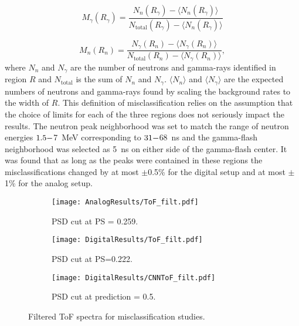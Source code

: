 \documentclass[main.tex]{subfiles}
\begin{document}
\begin{equation}
	M_\gamma(R_\gamma) = \frac{N_{n}(R_\gamma)-\langle N_n(R_\gamma)\rangle}{N_{\textrm{total}}(R_\gamma)-\langle N_n(R_\gamma)\rangle}
\end{equation}

\begin{equation}
	M_n(R_n) = \frac{N_{\gamma}(R_n)-\langle N_\gamma(R_n)\rangle}{N_{\textrm{total}}(R_n)-\langle N_\gamma(R_n)\rangle},
\end{equation}
where $N_n$ and $N_\gamma$ are the number of neutrons and gamma-rays identified in region $R$ and $N_{\textrm{total}}$ is the sum of $N_n$ and $N_\gamma$. $\langle N_n\rangle$ and $\langle N_\gamma\rangle$ are the expected numbers of neutrons and gamma-rays found by scaling the background rates to the width of $R$.
This definition of misclassification relies on the assumption that the choice of limits for each of the three regions does not seriously impact the results. The neutron peak neighborhood was set to match the range of neutron energies $1.5\--$\SI{7}{\MeV} corresponding to $31\--$\SI{68}{ns} and the gamma-flash neighborhood was selected as \SI{5}{\ns} on either side of the gamma-flash center.
It was found that as long as the peaks were contained in these regions the misclassifications changed by at most $\pm$0.5\% for the digital setup and at most $\pm$1\% for the analog setup. 


\begin{figure}
    \centering
    \begin{subfigure}[bh]{\textwidth}
   	   	\centering
	    \texttt{[image: AnalogResults/ToF\_filt.pdf]}
    	\caption{PSD cut at PS = 0.259.}
    	\label{fig:ToF_filt_A}
   	\end{subfigure}
    \begin{subfigure}[bh]{\textwidth}
   	    \centering
        \texttt{[image: DigitalResults/ToF\_filt.pdf]}
        \caption{PSD cut at PS=0.222.}
        \label{fig:ToF_filt_D}
    \end{subfigure}
	\begin{subfigure}[bh]{\textwidth}
	    \centering
        \texttt{[image: DigitalResults/CNNToF\_filt.pdf]}
        \caption{PSD cut at prediction = 0.5.}
        \label{fig:ToF_filt_D_CNN}
    \end{subfigure}
	\caption[Filtered ToF spectra for misclassification studies.]{Filtered ToF spectra for misclassification studies.}
    \label{fig:tof_cc_cnn}
\end{figure}
\end{document}

